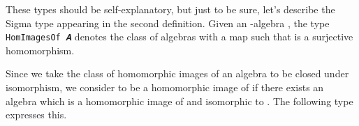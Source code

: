 \begin{code}
%
\>[1]\AgdaSpace{}%
\AgdaSpace{}%
\AgdaSymbol{=}\AgdaSpace{}%
\AgdaSpace{}%
\AgdaSpace{}%
\AgdaSpace{}%
\AgdaSymbol{(}\AgdaSpace{}%
\AgdaSpace{}%
\AgdaSymbol{)}\AgdaSpace{}%
\AgdaFunction{,}\AgdaSpace{}%
\AgdaSpace{}%
\AgdaSpace{}%
\AgdaSpace{}%
\AgdaSymbol{(}\AgdaSpace{}%
\AgdaSpace{}%
\AgdaSpace{}%
\AgdaSpace{}%
\AgdaSpace{}%
\AgdaSpace{}%
\AgdaSymbol{)}\AgdaSpace{}%
\AgdaFunction{,}\AgdaSpace{}%
\AgdaSpace{}%
\AgdaSpace{}%
\AgdaSpace{}%
\AgdaSpace{}%
\AgdaSpace{}%
\AgdaSpace{}%
\<%
\end{code}
\ccpad
These types should be self-explanatory, but just to be sure, let's
describe the Sigma type appearing in the second definition. Given an
-algebra , the type
\texttt{HomImagesOf\ 𝑨} denotes the class of algebras
 with a map
 such that  is a surjective
homomorphism.

Since we take the class of homomorphic images of an algebra to be closed
under isomorphism, we consider  to be a homomorphic image of
 if there exists an algebra  which is a homomorphic
image of  and isomorphic to . The following type
expresses this.
\ccpad
\begin{code}%
\>[0][@{}l@{\AgdaIndent{1}}]%
\>[1]\AgdaSpace{}%
\AgdaSymbol{:}\AgdaSpace{}%
\AgdaSymbol{(}\AgdaSpace{}%
\AgdaSymbol{:}\AgdaSpace{}%
\AgdaSpace{}%
\AgdaSpace{}%
\AgdaSymbol{)(}\AgdaSpace{}%
\AgdaSymbol{:}\AgdaSpace{}%
\AgdaSpace{}%
\AgdaSpace{}%
\AgdaSymbol{)}\AgdaSpace{}%
\AgdaSpace{}%
\AgdaSpace{}%
\AgdaSpace{}%
\AgdaSpace{}%
\AgdaSpace{}%
\AgdaSpace{}%
\AgdaSpace{}%
\AgdaSpace{}%
\AgdaSpace{}%
\<%
\\
%
\>[1]\AgdaSpace{}%
\AgdaSpace{}%
\AgdaSpace{}%
\AgdaSymbol{=}\AgdaSpace{}%
\AgdaSpace{}%
\AgdaSpace{}%
\AgdaSpace{}%
\AgdaSymbol{(}\AgdaSpace{}%
\AgdaSymbol{)}\AgdaSpace{}%
\AgdaFunction{,}\AgdaSpace{}%
\AgdaSpace{}%
\AgdaSpace{}%
\AgdaSpace{}%
\AgdaSpace{}%
\<%
\end{code}
\ccpad
